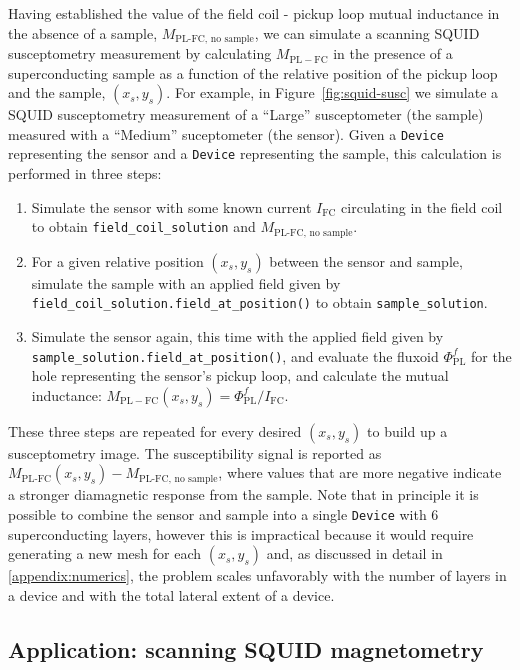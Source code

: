 \documentclass[final,3p,times,twocolumn]{elsarticle}
\newcommand{\inline}[1]{\texttt{#1}\xspace}
\begin{document}
Having established the value of the field coil - pickup loop mutual inductance in the absence of a sample, $M_\text{PL-FC, no sample}$, we can simulate a scanning SQUID susceptometry measurement by calculating $M_\mathrm{PL-FC}$ in the presence of a superconducting sample as a function of the relative position of the pickup loop and the sample, $(x_s, y_s)$. For example, in Figure~\ref{fig:squid-susc} we simulate a SQUID susceptometry measurement of a ``Large'' susceptometer (the sample) measured with a ``Medium'' suceptometer (the sensor). Given a \inline{Device} representing the sensor and a \inline{Device} representing the sample, this calculation is performed in three steps:
\begin{enumerate}
    \item{Simulate the sensor with some known current $I_\mathrm{FC}$ circulating in the field coil to obtain \inline{field_coil_solution} and $M_\text{PL-FC, no sample}$.}
    \item{For a given relative position $(x_s, y_s)$ between the sensor and sample, simulate the sample with an applied field given by \inline{field_coil_solution.field_at_position()} to obtain \inline{sample_solution}.}
    \item{Simulate the sensor again, this time with the applied field given by \inline{sample_solution.field_at_position()}, and evaluate the fluxoid $\Phi^f_\mathrm{PL}$ for the hole representing the sensor's pickup loop, and calculate the mutual inductance: $M_\mathrm{PL-FC}(x_s, y_s)=\Phi^f_\mathrm{PL} / I_\mathrm{FC}$.}
\end{enumerate}
These three steps are repeated for every desired $(x_s, y_s)$ to build up a susceptometry image. The susceptibility signal is reported as $M_\text{PL-FC}(x_s, y_s) - M_\text{PL-FC, no sample}$, where values that are more negative indicate a stronger diamagnetic response from the sample. Note that in principle it is possible to combine the sensor and sample into a single \inline{Device} with 6 superconducting layers, however this is impractical because it would require generating a new mesh for each $(x_s, y_s)$ and, as discussed in detail in \ref{appendix:numerics}, the problem scales unfavorably with the number of layers in a device and with the total lateral extent of a device.

\subsection{Application: scanning SQUID magnetometry}
\label{section:examples:magnetometry}
\end{document}
